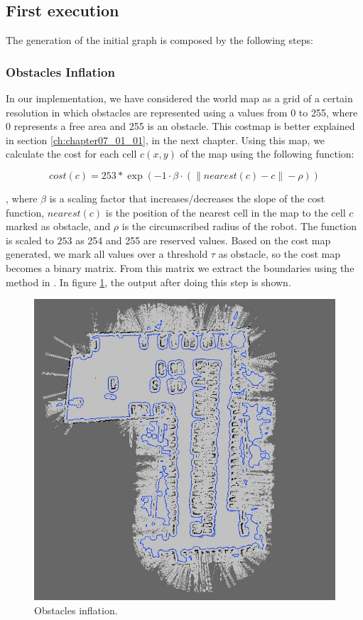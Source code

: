 \subsection{First execution}\label{ch:chapter06_01_01}

The generation of the initial graph is composed by the following steps:

\subsubsection{Obstacles Inflation}\label{ch:chapter06_01_01_01}

In our implementation, we have considered the world map as a grid of a certain resolution in which obstacles are represented using a values from 0 to 255, where 0 represents a free area and 255 is an obstacle. This costmap is better explained in section \ref{ch:chapter07_01_01}, in the next chapter. Using this map, we calculate the cost for each cell $c(x,y)$ of the map using the following function:

\begin{equation}\label{eq:cp06_cell_cost}
 cost(c) = 253 * \exp( -1 \cdot \beta \cdot (\| nearest(c) - c\| - \rho) )
\end{equation}

, where $\beta$ is a scaling factor that increases/decreases the slope of the cost function, $nearest(c)$ is the position of the nearest cell in the map to the cell $c$ marked as obstacle, and $\rho$ is the circumscribed radius of the robot. The function is scaled to $253$ as 254 and 255 are reserved values. Based on the cost map generated, we mark all values over a threshold $\tau$ as obstacle, so the cost map becomes a binary matrix. From this matrix we extract the boundaries using the method in \cite{suzuki1985topological}. In figure \ref{fig:cp06_obst_inflation}, the output after doing this step is shown.

\begin{figure}[h!]
  \centering
  \includegraphics[width=\textwidth, height=0.75\textwidth]{figure1}
  \caption{Obstacles inflation.}
  \label{fig:cp06_obst_inflation}
\end{figure}    

